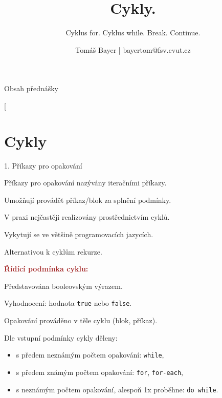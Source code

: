 \documentclass[czech]{beamer}
\date{}
\makeatletter
\newcommand\makebeamertitle{\frame{\maketitle}}%
\let\origtableofcontents=\tableofcontents
\def\tableofcontents{\@ifnextchar[{\origtableofcontents}{\gobbletableofcontents}}
\def\gobbletableofcontents#1{\origtableofcontents}
\makeatother
\begin{document}
\title{Cykly.}
\subtitle{Cyklus for. Cyklus while. Break. Continue.}
\author{Tomáš Bayer | bayertom@fsv.cvut.cz}
\makebeamertitle
\begin{frame}{Obsah přednášky}

\tableofcontents{}
\end{frame}

\section{Cykly}
\begin{frame}{1. Příkazy pro opakování}

Příkazy pro opakování nazývány iteračními příkazy.

Umožňují provádět příkaz/blok za splnění podmínky.\bigskip{}

V praxi nejčastěji realizovány prostřednictvím cyklů.

Vykytují se ve většině programovacích jazycích.\bigskip{}

Alternativou k cyklům rekurze.

\bigskip{}

\textbf{\textcolor{brown}{Řídící podmínka cyklu:}}

Představována booleovským výrazem.

Vyhodnocení: hodnota \texttt{true} nebo \texttt{false}.

\bigskip{}
Opakování prováděno v těle cyklu (blok, příkaz).\bigskip{}

Dle vstupní podmínky cykly děleny:
\begin{itemize}
\item s předem neznámým počtem opakování: \texttt{while},
\item s předem známým počtem opakování: \texttt{for}, \texttt{for-each},
\item s neznámým počtem opakování, alespoň 1x proběhne: \texttt{do while}.
\end{itemize}
\end{frame}
\end{document}
